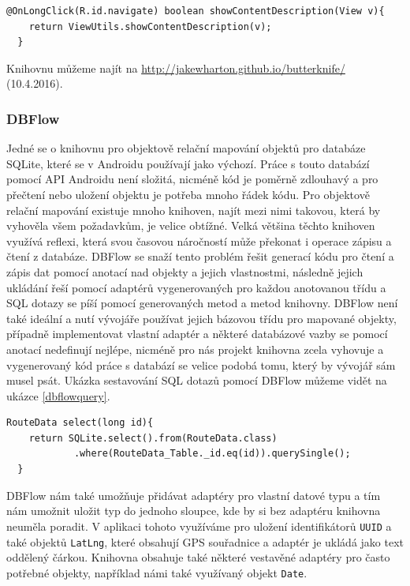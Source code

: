 \documentclass[czech,master,public,dept460,male,java,cpdeclaration]{diploma}
\begin{document}
\begin{lstlisting}[label=butterknife,caption=Použití knihovny Butter Knife]
  @OnLongClick(R.id.navigate) boolean showContentDescription(View v){
    return ViewUtils.showContentDescription(v);
  }

\end{lstlisting}

Knihovnu můžeme najít na \url{http://jakewharton.github.io/butterknife/}  (10.4.2016).

\subsubsection{DBFlow}\label{dbflow}
Jedné se o knihovnu pro objektově relační mapování objektů pro databáze SQLite, které se v
 Androidu používají jako výchozí. Práce s touto databází pomocí API Androidu není
 složitá, nicméně kód je poměrně zdlouhavý a pro přečtení nebo uložení objektu je potřeba
 mnoho řádek kódu. Pro objektově relační mapování existuje mnoho knihoven, najít mezi nimi takovou,
 která by vyhověla všem požadavkům, je velice obtížné. Velká většina těchto knihoven využívá reflexi,
 která svou časovou náročností může překonat i operace zápisu a čtení z databáze.
 DBFlow se snaží tento problém řešit generací kódu pro čtení a zápis dat pomocí anotací nad objekty
 a jejich vlastnostmi, následně jejich ukládání řeší pomocí adaptérů vygenerovaných pro každou anotovanou
 třídu a SQL dotazy se píší pomocí generovaných metod a metod knihovny. DBFlow není také ideální
  a nutí vývojáře používat jejich bázovou třídu pro mapované objekty, případně implementovat vlastní
  adaptér a některé databázové vazby se pomocí anotací nedefinují nejlépe, nicméně pro nás projekt
  knihovna zcela vyhovuje a vygenerovaný kód práce s databází se velice podobá tomu, který by vývojář
  sám musel psát. Ukázka sestavování SQL dotazů pomocí DBFlow můžeme vidět na ukázce \ref{dbflowquery}.

\begin{lstlisting}[label=dbflowquery,caption=Sestavování SQL dotazů s DBFlow]
  RouteData select(long id){
    return SQLite.select().from(RouteData.class)
            .where(RouteData_Table._id.eq(id)).querySingle();
  }
\end{lstlisting}

  DBFlow nám také umožňuje přidávat adaptéry pro vlastní datové typu a tím nám umožnit uložit
  typ do jednoho sloupce, kde by si bez adaptéru knihovna neuměla poradit. V aplikaci
  tohoto využíváme pro uložení identifikátorů \texttt{UUID} a také objektů \texttt{LatLng},
  které obsahují GPS souřadnice a adaptér je ukládá jako text oddělený čárkou.
  Knihovna obsahuje také některé vestavěné adaptéry pro často potřebné objekty, například námi
  také využívaný objekt \texttt{Date}.
\end{document}
